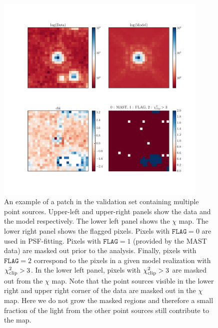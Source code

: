 
\begin{figure}
\includegraphics[width=0.9\textwidth , height=0.9\textwidth ]{figures/wfc3ir/example2.pdf}
\caption{\label{fig:validation_1} An example of a patch in the validation set containing multiple point sources. Upper-left and upper-right panels show the data and the model respectively. The lower left panel shows the $\chi$ map. The lower right panel shows the flagged pixels. Pixels with $\mathtt{FLAG}=0$ are used in PSF-fitting. Pixels with $\mathtt{FLAG}=1$ (provided by the MAST data) are masked out prior to the analysis. Finally, pixels with $\mathtt{FLAG}=2$ correspond to the pixels in a given model realization with $\chi^{2}_{\rm clip} > 3$. In the lower left panel, pixels with  $\chi^{2}_{\rm clip} > 3$ are masked out from the $\chi$ map. Note that the point sources visible in the lower right and upper right corner of the data are masked out in the $\chi$ map. Here we do not grow the masked regions and therefore a small fraction of the light from the other point sources still contribute to the map.}
\end{figure}


